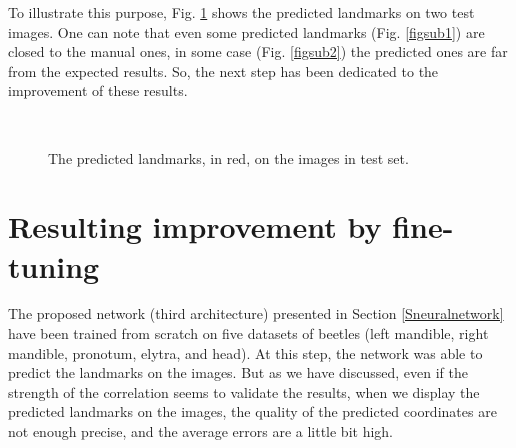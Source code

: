 \documentclass[review]{elsarticle}
\begin{document}
To illustrate this purpose, Fig. \ref{figrsexample} shows the predicted landmarks on two test images. One can note that even some predicted landmarks (Fig. \ref{figsub1}) are closed to the manual ones, in some case (Fig. \ref{figsub2}) the predicted ones are far from the expected results. So, the next step has been dedicated to the improvement of these results.
\begin{figure}[htbp]
    \centering
    ~~
\\    
    \caption{The predicted landmarks, in red,  on the images in test set.}
    \label{figrsexample}
\end{figure}

\section{Resulting improvement by fine-tuning}
\label{sfineTuning}
The proposed network (third architecture) presented in Section \ref{Sneuralnetwork} have been trained from scratch on five datasets of beetles (left mandible, right mandible, pronotum, elytra, and head). At this step, the network was able to predict the landmarks on the images. But as we have discussed, even if the strength of the correlation seems to validate the results, when we display the predicted landmarks on the images, the quality of the predicted coordinates are not enough precise, and the average errors are a little bit high.
\end{document}
